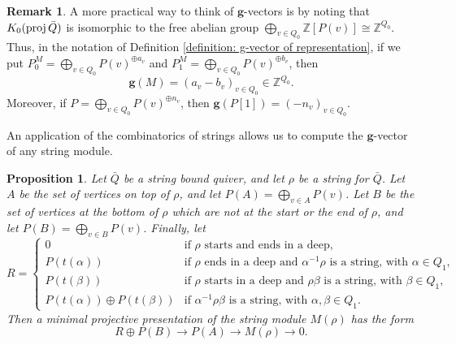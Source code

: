 \documentclass{amsart}
\newtheorem{proposition}[theorem]{Proposition}
\theoremstyle{definition}
\newtheorem{remark}[theorem]{Remark}
\newcommand{\Z}{\mathbb{Z}} %
\renewcommand{\b}[1]{\mathbf{#1}} %
\newcommand{\proj}{\operatorname{{\rm proj}}}
\begin{document}
\begin{remark}
 A more practical way to think of $\b{g}$-vectors is by noting that $K_0(\proj \bar Q)$ is isomorphic to the free abelian group
 $\bigoplus_{v\in Q_0} \Z [P(v)] \cong \Z^{Q_0}$.  Thus, in the notation of Definition \ref{definition: g-vector of representation},
 if we put $P_0^M = \bigoplus_{v\in Q_0}P(v)^{\oplus a_v}$ and $P_1^M = \bigoplus_{v\in Q_0}P(v)^{\oplus b_v}$, 
 then
 \[
  \b{g}(M) = (a_v - b_v)_{v\in Q_0} \in \Z^{Q_0}.
 \] 
 Moreover, if $P = \bigoplus_{v\in Q_0}P(v)^{\oplus n_v}$, then $\b{g}(P[1]) = (-n_v)_{v\in Q_0}$.
\end{remark}

An application of the combinatorics of strings allows us to compute the $\b{g}$-vector of any string module.

\begin{proposition}
 Let $\bar Q$ be a string bound quiver, and let $\rho$ be a string for $\bar Q$.  
 Let $A$ be the set of vertices on top of $\rho$, and let $P(A) = \bigoplus_{v\in A} P(v)$.
 Let $B$ be the set of vertices at the bottom of $\rho$ which are not at the start or the end of $\rho$,
 and let $P(B) = \bigoplus_{v\in B} P(v)$.  Finally, let 
 \[
  R = \begin{cases}
          0 & \textrm{if $\rho$ starts and ends in a deep,} \\
          P({t(\alpha)})   & \textrm{if $\rho$ ends in a deep and $\alpha^{-1}\rho$ is a string, with $\alpha\in Q_1$,} \\
          P({t(\beta)})    & \textrm{if $\rho$ starts in a deep and $\rho\beta$ is a string, with $\beta\in Q_1$,} \\
          P({t(\alpha)}) \oplus P({t(\beta)})  & \textrm{if $\alpha^{-1}\rho\beta$ is a string, with $\alpha, \beta\in Q_1$.}
        \end{cases}
 \]
 Then a minimal projective presentation of the string module $M(\rho)$ has the form
 \[
  R\oplus P(B) \to P(A) \to M(\rho) \to 0.
 \]
\end{proposition}
\end{document}
